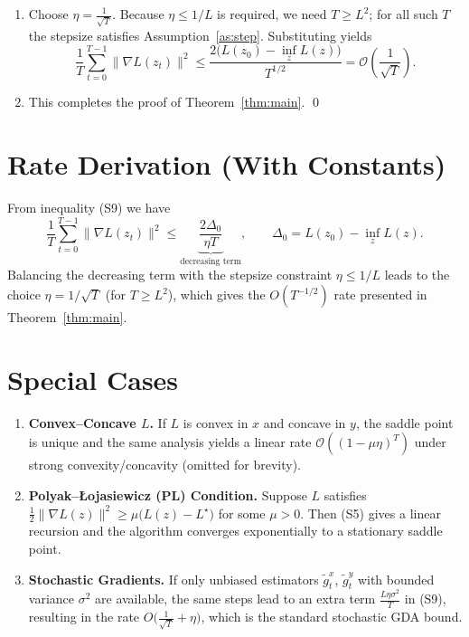 \documentclass{article}
\begin{document}
\begin{enumerate}
\item[Step 10:]  Choose $\displaystyle\eta = \frac{1}{\sqrt{T}}$.  
Because $\eta\le 1/L$ is required, we need $T\ge L^{2}$; for all such $T$ the stepsize
satisfies Assumption~\ref{as:step}.  Substituting yields
\[
\frac{1}{T}\sum_{t=0}^{T-1}\|\nabla L(z_t)\|^{2}
\le \frac{2\big(L(z_0)-\inf_{z}L(z)\big)}{T^{1/2}}
= \mathcal{O}\!\left(\frac{1}{\sqrt{T}}\right). \tag{S10}
\]

\item[Step 11:]  This completes the proof of Theorem~\ref{thm:main}. \qed
\end{enumerate}

\section*{Rate Derivation (With Constants)}
From inequality (S9) we have
\[
\frac{1}{T}\sum_{t=0}^{T-1}\|\nabla L(z_t)\|^{2}
\le
\underbrace{\frac{2\Delta_{0}}{\eta T}}_{\text{decreasing term}},
\qquad
\Delta_{0}=L(z_0)-\inf_{z}L(z).
\]
Balancing the decreasing term with the stepsize constraint $\eta\le 1/L$ leads to the
choice $\eta=1/\sqrt{T}$ (for $T\ge L^{2}$), which gives the $O(T^{-1/2})$ rate
presented in Theorem~\ref{thm:main}.

\section*{Special Cases}
\begin{enumerate}[label=\alph*.]
\item \textbf{Convex–Concave $L$.}  If $L$ is convex in $x$ and concave in $y$, the
saddle point is unique and the same analysis yields a linear rate
$\mathcal{O}((1-\mu\eta)^{T})$ under strong convexity/concavity (omitted for brevity).

\item \textbf{Polyak–Łojasiewicz (PL) Condition.}  Suppose $L$ satisfies
$\frac12\|\nabla L(z)\|^{2}\ge \mu\big(L(z)-L^{\star}\big)$ for some $\mu>0$.
Then (S5) gives a linear recursion and the algorithm converges exponentially
to a stationary saddle point.

\item \textbf{Stochastic Gradients.}  If only unbiased estimators
$\tilde{g}^{x}_t$, $\tilde{g}^{y}_t$ with bounded variance $\sigma^{2}$ are available,
the same steps lead to an extra term $ \frac{L\eta\sigma^{2}}{T}$ in (S9),
resulting in the rate $O\big(\frac{1}{\sqrt{T}}+\eta\big)$, which is the standard
stochastic GDA bound.
\end{enumerate}

\end{document}
